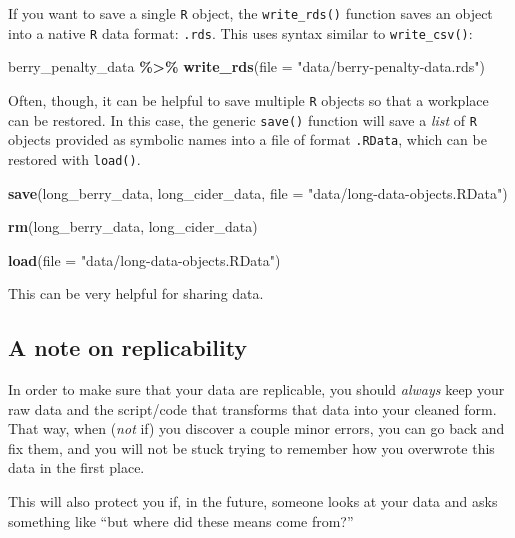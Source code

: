 \documentclass[
]{book}
\newenvironment{Shaded}{\begin{snugshade}}{\end{snugshade}}
\newcommand{\AttributeTok}[1]{\textcolor[rgb]{0.13,0.29,0.53}{#1}}
\newcommand{\FunctionTok}[1]{\textcolor[rgb]{0.13,0.29,0.53}{\textbf{#1}}}
\newcommand{\NormalTok}[1]{#1}
\newcommand{\SpecialCharTok}[1]{\textcolor[rgb]{0.81,0.36,0.00}{\textbf{#1}}}
\newcommand{\StringTok}[1]{\textcolor[rgb]{0.31,0.60,0.02}{#1}}
\begin{document}
If you want to save a single \texttt{R} object, the \texttt{write\_rds()} function saves an object into a native \texttt{R} data format: \texttt{.rds}. This uses syntax similar to \texttt{write\_csv()}:

\begin{Shaded}
\begin{Highlighting}[]
\NormalTok{berry\_penalty\_data }\SpecialCharTok{\%\textgreater{}\%}
  \FunctionTok{write\_rds}\NormalTok{(}\AttributeTok{file =} \StringTok{"data/berry{-}penalty{-}data.rds"}\NormalTok{)}
\end{Highlighting}
\end{Shaded}

Often, though, it can be helpful to save multiple \texttt{R} objects so that a workplace can be restored. In this case, the generic \texttt{save()} function will save a \emph{list} of \texttt{R} objects provided as symbolic names into a file of format \texttt{.RData}, which can be restored with \texttt{load()}.

\begin{Shaded}
\begin{Highlighting}[]
\FunctionTok{save}\NormalTok{(long\_berry\_data,}
\NormalTok{     long\_cider\_data,}
     \AttributeTok{file =} \StringTok{"data/long{-}data{-}objects.RData"}\NormalTok{)}

\FunctionTok{rm}\NormalTok{(long\_berry\_data, long\_cider\_data)}

\FunctionTok{load}\NormalTok{(}\AttributeTok{file =} \StringTok{"data/long{-}data{-}objects.RData"}\NormalTok{)}
\end{Highlighting}
\end{Shaded}

This can be very helpful for sharing data.

\hypertarget{a-note-on-replicability}{%
\subsection{A note on replicability}\label{a-note-on-replicability}}

In order to make sure that your data are replicable, you should \emph{always} keep your raw data and the script/code that transforms that data into your cleaned form. That way, when (\emph{not} if) you discover a couple minor errors, you can go back and fix them, and you will not be stuck trying to remember how you overwrote this data in the first place.

This will also protect you if, in the future, someone looks at your data and asks something like ``but where did these means come from?''
\end{document}
